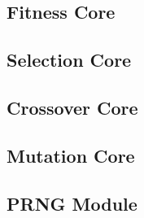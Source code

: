 \subsection{Fitness Core} \label{fpga:fitness:ss:design_of_the_fitness_core}
     \label{fpga:subsection:fitness_core}

\subsection {Selection Core} \label{fpga:selection:ss:selection_core}
     \label{fpga:subsection:selection_core}

\subsection{Crossover Core} \label{fpga:crossover:ss:crossover_core}
     \label{fpga:subsection:crossover_core}

\subsection{Mutation Core}\label{fpga:mutation:ss:mutation_core}
     \label{fpga:subsection:mutation_core}

\subsection{PRNG Module}



